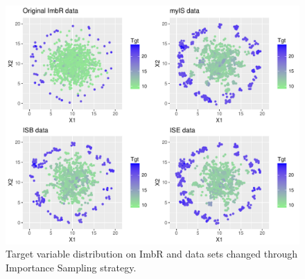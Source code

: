\documentclass[10pt,a4paper]{article}\usepackage[]{graphicx}\usepackage[]{color}
\makeatletter
\def\maxwidth{ %
  \ifdim\Gin@nat@width>\linewidth
    \linewidth
  \else
    \Gin@nat@width
  \fi
}
\newenvironment{knitrout}{}{} %
\makeatother
\begin{document}
\begin{knitrout}\footnotesize
{}\color{fgcolor}\begin{figure}

{\centering \includegraphics[width=\maxwidth]{figures/UBL-IS_new_plot3-1} 

}

\caption[Target variable distribution on ImbR and data sets changed through Importance Sampling strategy]{Target variable distribution on ImbR and data sets changed through Importance Sampling strategy.}\label{fig:IS_new_plot3}
\end{figure}


\end{knitrout}
\end{document}
